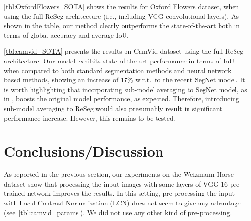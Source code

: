 \autoref{tbl:OxfordFlowers_SOTA} shows the results for Oxford Flowers
dataset, when using the full ReSeg architecture (i.e., including VGG convolutional layers).
As shown in the table, our method clearly outperforms the
state-of-the-art both in terms of global accuracy and average IoU.

\autoref{tbl:camvid_SOTA} presents the results on CamVid dataset using the full
ReSeg architecture. Our model exhibits state-of-the-art performance in terms of
IoU when compared to both standard segmentation methods and neural network
based methods, showing an increase of $17\%$ w.r.t.\ to the recent SegNet
model. It is worth highlighting that incorporating sub-model averaging to
SegNet model, as in \cite{Kendall2015bayesiansegnet}, boosts the original model
performance, as expected. Therefore, introducing sub-model averaging to ReSeg
would also presumably result in significant performance increase.  However,
this remains to be tested.




\section{Conclusions/Discussion}

As reported in the previous section, our experiments on the Weizmann Horse
dataset show that processing the input images with some layers of VGG-16
pre-trained network improves the results. In this setting, pre-processing the input
with Local Contrast Normalization (LCN) does not seem to give any advantage
(see~\autoref{tbl:camvid_params}). We did not use any other kind of
pre-processing.

